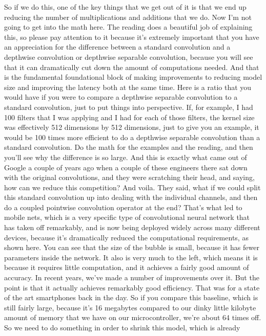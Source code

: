 So if we do this, one of the key things that we get out of it
is that we end up reducing the number of multiplications and additions
that we do.
Now I'm not going to get into the math here.
The reading does a beautiful job of explaining this,
so please pay attention to it because it's extremely important that you
have an appreciation for the difference between a standard convolution
and a depthwise convolution or depthwise separable convolution,
because you will see that it can dramatically cut down
the amount of computations needed.
And that is the fundamental foundational block
of making improvements to reducing model size
and improving the latency both at the same time.
Here is a ratio that you would have if you
were to compare a depthwise separable convolution to a standard convolution,
just to put things into perspective.
If, for example, I had 100 filters that I was applying
and I had for each of those filters, the kernel size
was effectively 512 dimensions by 512 dimensions,
just to give you an example, it would be 100 times more
efficient to do a depthwise separable convolution
than a standard convolution.
Do the math for the examples and the reading,
and then you'll see why the difference is so large.
And this is exactly what came out of Google a couple of years
ago when a couple of these engineers there sat down
with the original convolutions, and they were scratching their head, and saying,
how can we reduce this competition?
And voila.
They said, what if we could split this standard convolution up
into dealing with the individual channels,
and then do a coupled pointwise convolution operator at the end?
That's what led to mobile nets, which is a very specific type
of convolutional neural network that has taken off remarkably,
and is now being deployed widely across many different devices,
because it's dramatically reduced the computational requirements, as shown
here.
You can see that the size of the bubble is small,
because it has fewer parameters inside the network.
It also is very much to the left, which means
it is because it requires little computation,
and it achieves a fairly good amount of accuracy.
In recent years, we've made a number of improvements over it.
But the point is that it actually achieves remarkably good efficiency.
That was for a state of the art smartphones back in the day.
So if you compare this baseline, which is still fairly large, because it's
16 megabytes compared to our dinky little kilobyte amount of memory
that we have on our microcontroller, we're about 64 times off.
So we need to do something in order to shrink this model, which is already
